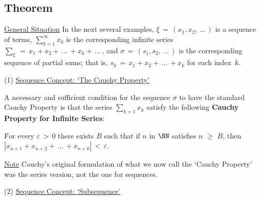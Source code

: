 \V

        \subsection{\small{{\bf Theorem}}}
        \label{ThmG30.60}

        \underline{General Situation} In the next several examples, ${\xi} \,=\, (x_{1},x_{2},\,{\ldots}\,)$ is a sequence of terms,
    $\sum_{k=1}^{{\infty}} x_{k}$ is the corresponding infinite series $\sum_{{\xi}} \,=\, x_{1} + x_{2} +\,{\ldots}\,+x_{k}+\,{\ldots}\, $,
    and ${\sigma} \,=\, (s_{1},s_{2},\,{\ldots}\,)$ is the corresponding sequence of partial sums;
    that is, $s_{k} \,=\, x_{1}+x_{2} + \,{\ldots}\,+ x_{k}$ for each index~$k$.

\V

        (1) \underline{Sequence Concept: `The Cauchy Property'}

        A necessary and sufficient condition for the sequence ${\sigma}$ to have the standard Cauchy Property is that the series $\sum_{k=1} x_{k}$ satisfy the following {\bf Cauchy Property for Infinite Series}:

        \h For every ${\varepsilon}\,>\,0$ there exists $B$ such that if $n$ in ${\NN}$ satisfies $n\,\,{\geq}\,\,B$, then $|x_{n+1} + x_{n+2} + \,{\ldots}\, + x_{n+k}|\,<\,{\varepsilon}$.

        \underline{Note} Cauchy's original formulation of what we now call the `Cauchy Property' was the series version, not the one for sequences.

\V

        (2) \underline{Sequence Concept: `Subsequence'}

